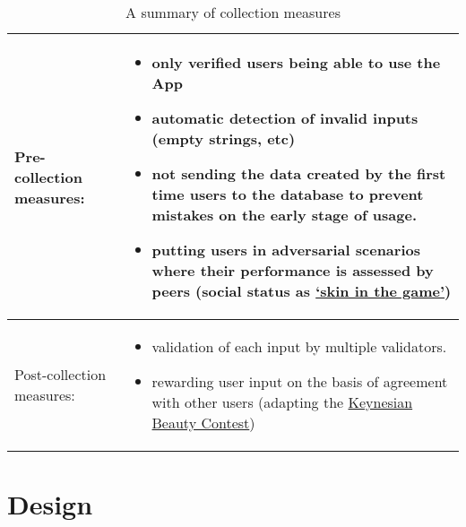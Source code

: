 \documentclass{article}
\begin{document}
  \begin{table}[h!]
      \centering
    \begin{tabular}{|l|p{4cm}|}
\toprule
Pre-collection measures:  & \begin{itemize}[left=0pt,topsep=0pt]\item only verified users being able to use the App
  \item automatic detection of invalid inputs (empty strings, etc)
  \item not sending the data created by the first time users to the database to prevent mistakes on the early stage of usage.
  \item putting users in adversarial scenarios where their performance is assessed by peers (social status as \href{https://dictionary.cambridge.org/dictionary/english/have-skin-in-the-game}{`skin in the game'})
\end{itemize} \\
\midrule
       Post-collection measures:  & \begin{itemize}[left=0pt,topsep=0pt]
  \item validation of each input by multiple validators.  
  \item rewarding user input on the basis of agreement with other users (adapting the \href{https://en.wikipedia.org/wiki/Keynesian_beauty_contest}{Keynesian Beauty Contest}\cite{Keynes1936})
\end{itemize} \\
\bottomrule
    \end{tabular}
    \caption{A summary of collection measures}

 \end{table}\label{tab:collection}

\newpage

\chapter{Design}
\end{document}
